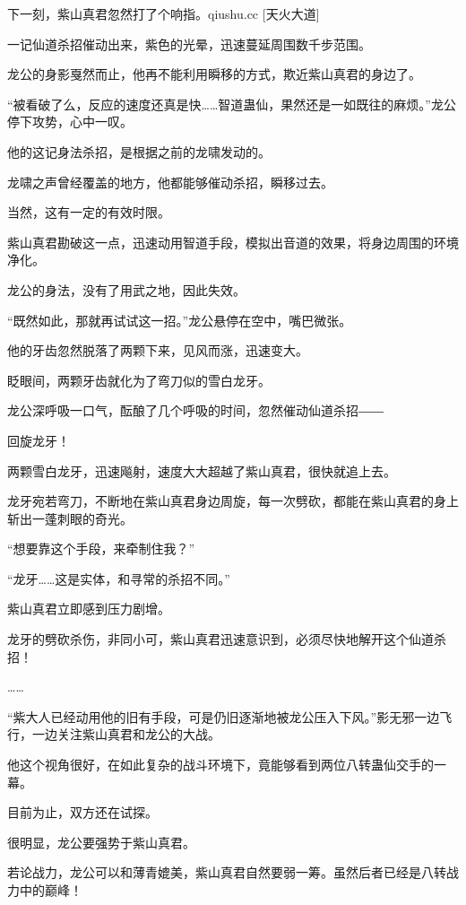 
\begin{this_body}

下一刻，紫山真君忽然打了个响指。qiushu.cc [天火大道]

一记仙道杀招催动出来，紫色的光晕，迅速蔓延周围数千步范围。

龙公的身影戛然而止，他再不能利用瞬移的方式，欺近紫山真君的身边了。

“被看破了么，反应的速度还真是快……智道蛊仙，果然还是一如既往的麻烦。”龙公停下攻势，心中一叹。

他的这记身法杀招，是根据之前的龙啸发动的。

龙啸之声曾经覆盖的地方，他都能够催动杀招，瞬移过去。

当然，这有一定的有效时限。

紫山真君勘破这一点，迅速动用智道手段，模拟出音道的效果，将身边周围的环境净化。

龙公的身法，没有了用武之地，因此失效。

“既然如此，那就再试试这一招。”龙公悬停在空中，嘴巴微张。

他的牙齿忽然脱落了两颗下来，见风而涨，迅速变大。

眨眼间，两颗牙齿就化为了弯刀似的雪白龙牙。

龙公深呼吸一口气，酝酿了几个呼吸的时间，忽然催动仙道杀招――

回旋龙牙！

两颗雪白龙牙，迅速飚射，速度大大超越了紫山真君，很快就追上去。

龙牙宛若弯刀，不断地在紫山真君身边周旋，每一次劈砍，都能在紫山真君的身上斩出一蓬刺眼的奇光。

“想要靠这个手段，来牵制住我？”

“龙牙……这是实体，和寻常的杀招不同。”

紫山真君立即感到压力剧增。

龙牙的劈砍杀伤，非同小可，紫山真君迅速意识到，必须尽快地解开这个仙道杀招！

……

“紫大人已经动用他的旧有手段，可是仍旧逐渐地被龙公压入下风。”影无邪一边飞行，一边关注紫山真君和龙公的大战。

他这个视角很好，在如此复杂的战斗环境下，竟能够看到两位八转蛊仙交手的一幕。

目前为止，双方还在试探。

很明显，龙公要强势于紫山真君。

若论战力，龙公可以和薄青媲美，紫山真君自然要弱一筹。虽然后者已经是八转战力中的巅峰！


\end{this_body}
